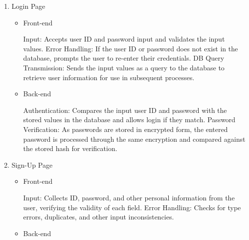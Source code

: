 \documentclass[conference]{IEEEtran}
\begin{document}
\begin{enumerate}
\setlength{\parindent}{2ex}
\item Login Page

\begin{itemize}
\setlength{\parindent}{2ex}
\item Front-end

Input: Accepts user ID and password input and validates the input values. \newline\hspace*{1.2ex}
Error Handling: If the user ID or password does not exist in the database, prompts the user to re-enter their credentials.\newline\hspace*{1.2ex}
DB Query Transmission: Sends the input values as a query to the database to retrieve user information for use in subsequent processes.

\item Back-end

Authentication: Compares the input user ID and password with the stored values in the database and allows login if they match. \newline\hspace*{1.2ex}
Password Verification: As passwords are stored in encrypted form, the entered password is processed through the same encryption and compared against the stored hash for verification.

\end{itemize}

\item Sign-Up Page

\begin{itemize}
\setlength{\parindent}{2ex}
\item Front-end

Input: Collects ID, password, and other personal information from the user, verifying the validity of each field. \newline\hspace*{1.2ex}
Error Handling: Checks for type errors, duplicates, and other input inconsistencies.

\item Back-end


\end{itemize}
\end{enumerate}
\end{document}
